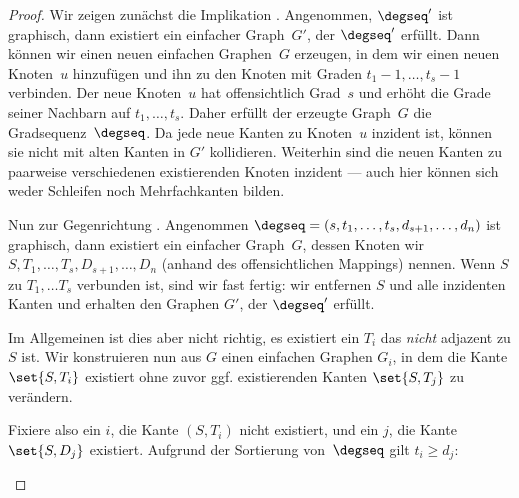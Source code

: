 \begin{proof}
    Wir  zeigen zunächst die Implikation .
    Angenommen, $\degseq'$ ist graphisch, dann existiert ein einfacher Graph~$G'$, der $\degseq'$ erfüllt.
    Dann können wir einen neuen einfachen Graphen~$G$ erzeugen, in dem wir einen neuen Knoten~$u$ hinzufügen und ihn zu den Knoten mit Graden $t_1{-}1, \ldots, t_s{-}1$ verbinden.
    Der neue Knoten~$u$ hat offensichtlich Grad~$s$ und erhöht die Grade seiner Nachbarn auf $t_1, \ldots, t_s$.
    Daher erfüllt der erzeugte Graph~$G$ die Gradsequenz~$\degseq$.
    Da jede neue Kanten zu Knoten~$u$ inzident ist, können sie nicht mit alten Kanten in $G'$ kollidieren.
    Weiterhin sind die neuen Kanten zu paarweise verschiedenen existierenden Knoten inzident --- auch hier können sich weder Schleifen noch Mehrfachkanten bilden.

    Nun  zur Gegenrichtung .
    Angenommen $\degseq = (s, t_1, \ldots, t_s, d_{s+1}, \ldots, d_n)$ ist graphisch, dann existiert ein einfacher Graph~$G$, dessen Knoten wir $S, T_1, \ldots, T_s, D_{s+1}, \ldots, D_n$ (anhand des offensichtlichen Mappings) nennen.
    Wenn $S$ zu $T_1, \ldots T_s$ verbunden ist, sind wir fast fertig: wir entfernen $S$ und alle inzidenten Kanten und erhalten den Graphen $G'$, der $\degseq'$ erfüllt.

    Im Allgemeinen ist dies aber nicht richtig, \dh es existiert ein $T_i$ das \emph{nicht} adjazent zu $S$ ist.
    Wir konstruieren nun aus $G$ einen einfachen Graphen $G_i$, in dem die Kante $\set{S, T_i}$ existiert ohne zuvor ggf. existierenden Kanten $\set{S, T_j}$ zu verändern.

    Fixiere also ein $i$, \sd die Kante $(S, T_i)$ nicht existiert, und ein $j$, \sd die Kante $\set{S, D_j}$ existiert.
    Aufgrund der Sortierung von~$\degseq$ gilt $t_i \ge d_j$:
    \begin{figure}
        \begin{center}
            \begin{tikzpicture}[
                    node distance=4em,
                    node/.style={draw, inner sep=0, minimum width=1.5em, minimum height=1.5em, circle},
                    edge/.style={draw, thick, black},
                    nonedge/.style={draw, dashed, red},
                ]


\end{tikzpicture}
\end{center}
\end{figure}
\end{proof}
